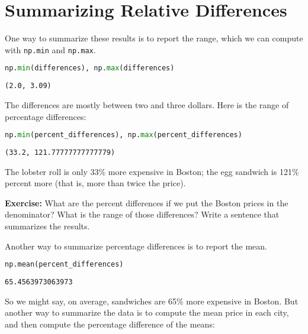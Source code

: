\hypertarget{summarizing-relative-differences}{%
\section{Summarizing Relative
Differences}\label{summarizing-relative-differences}}

One way to summarize these results is to report the range, which we can
compute with \passthrough{\lstinline!np.min!} and
\passthrough{\lstinline!np.max!}.

\begin{lstlisting}[language=Python,style=source]
np.min(differences), np.max(differences)
\end{lstlisting}

\begin{lstlisting}[style=output]
(2.0, 3.09)
\end{lstlisting}

The differences are mostly between two and three dollars. Here is the
range of percentage differences:

\begin{lstlisting}[language=Python,style=source]
np.min(percent_differences), np.max(percent_differences)
\end{lstlisting}

\begin{lstlisting}[style=output]
(33.2, 121.77777777777779)
\end{lstlisting}

The lobster roll is only 33\% more expensive in Boston; the egg sandwich
is 121\% percent more (that is, more than twice the price).

\textbf{Exercise:} What are the percent differences if we put the Boston
prices in the denominator? What is the range of those differences? Write
a sentence that summarizes the results.

Another way to summarize percentage differences is to report the mean.

\begin{lstlisting}[language=Python,style=source]
np.mean(percent_differences)
\end{lstlisting}

\begin{lstlisting}[style=output]
65.4563973063973
\end{lstlisting}

So we might say, on average, sandwiches are 65\% more expensive in
Boston. But another way to summarize the data is to compute the mean
price in each city, and then compute the percentage difference of the
means:

